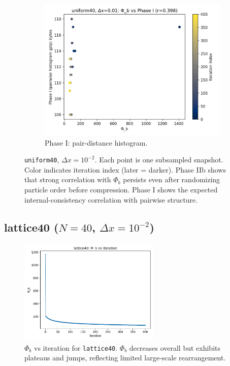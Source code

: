 \documentclass[11pt,a4paper]{article}
\numberwithin{equation}{section}
\newcommand{\phib}{\Phi_b}
\begin{document}
\begin{figure}[h!]
\begin{subfigure}[b]{0.32\textwidth}
\includegraphics[width=\textwidth]{figures/uniform40_dx0.01_phib_vs_phase1.png}
\caption{Phase I: pair-distance histogram.}
\end{subfigure}
\caption{\texttt{uniform40}, $\Delta x{=}10^{-2}$. Each point is one subsampled snapshot. Color indicates iteration index (later = darker). Phase IIb shows that strong correlation with $\phib$ persists even after randomizing particle order before compression. Phase I shows the expected internal-consistency correlation with pairwise structure.}
\label{fig:uniform40_corr}
\end{figure}

\subsection{lattice40 ($N{=}40$, $\Delta x = 10^{-2}$)}
\begin{figure}[h!]
\centering
\includegraphics[width=0.6\textwidth]{figures/lattice40_dx0.01_phib_vs_iter.png}
\caption{$\phib$ vs iteration for \texttt{lattice40}. $\phib$ decreases overall but exhibits plateaus and jumps, reflecting limited large-scale rearrangement.}
\label{fig:lattice40_iter}
\end{figure}
\end{document}
